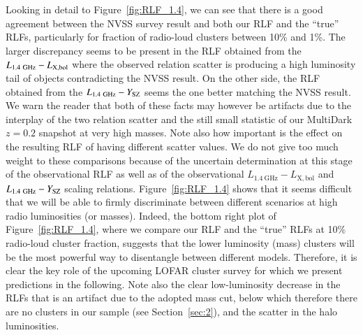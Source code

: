 \documentclass[traditabstract]{aa}
\newcommand{\rmn}{\mathrm}
\begin{document}
Looking in detail to Figure~\ref{fig:RLF_1.4}, we can see that there is a good agreement between the NVSS survey result and both our RLF and the ``true'' RLFs, particularly for fraction of radio-loud clusters between 10\% and 1\%. The larger discrepancy seems to be present in the RLF obtained from the $L_{1.4~\rmn{GHz}}-L_{\rm{X,bol}}$ where the  observed relation scatter is producing a high luminosity tail of objects contradicting the NVSS result. On the other side, the RLF obtained from the $L_{1.4~\rmn{GHz}}-Y_{\rm{SZ}}$ seems the one better matching the NVSS result. We warn the reader that both of these facts may however be artifacts due to the interplay of the two relation scatter and the still small statistic of our MultiDark $z = 0.2$ snapshot at very high masses. Note also how important is the effect on the resulting RLF of having different scatter values. We do not give too much weight to these comparisons because of the uncertain determination at this stage of the observational RLF as well as of the observational $L_{1.4~\rmn{GHz}}-L_{\rmn{X,bol}}$ and $L_{1.4~\rmn{GHz}}-Y_{\rm{SZ}}$ scaling relations. Figure~\ref{fig:RLF_1.4} shows that it seems difficult that we will be able to firmly discriminate between different scenarios at high radio luminosities (or masses). Indeed, the bottom right plot of Figure~\ref{fig:RLF_1.4}, where we compare our RLF and the ``true'' RLFs at 10\% radio-loud cluster fraction, suggests that the lower luminosity (mass) clusters will be the most powerful way to disentangle between different models. Therefore, it is clear the key role of the upcoming LOFAR cluster survey for which we present predictions in the following. Note also the clear low-luminosity decrease in the RLFs that is an artifact due to the adopted mass cut, below which therefore there are no clusters in our sample (see Section~\ref{sec:2}), and the scatter in the halo luminosities.
\end{document}
